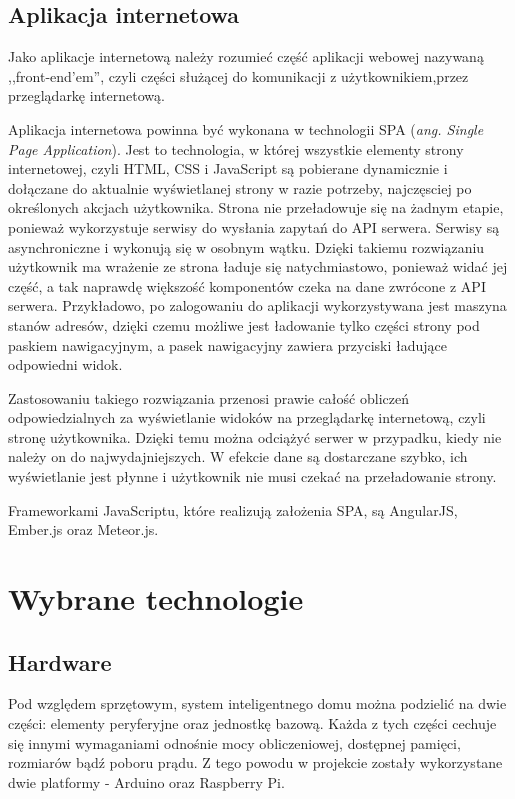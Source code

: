 \documentclass[eng,oneside]{mgr}
\begin{document}
\section{Aplikacja internetowa}
Jako aplikacje internetową należy rozumieć część aplikacji webowej nazywaną ,,front-end’em'', czyli części służącej do komunikacji z użytkownikiem,przez przeglądarkę internetową.

Aplikacja internetowa powinna być wykonana w technologii SPA (\emph{ang. Single Page Application}). Jest to technologia, w której wszystkie elementy strony internetowej, czyli HTML, CSS i JavaScript są pobierane dynamicznie i dołączane do aktualnie wyświetlanej strony w razie potrzeby, najczęsciej po określonych akcjach użytkownika. Strona nie przeładowuje się na żadnym etapie, ponieważ wykorzystuje serwisy do wysłania zapytań do API serwera. Serwisy są asynchroniczne i wykonują się w osobnym wątku. Dzięki takiemu rozwiązaniu użytkownik ma wrażenie ze strona ładuje się natychmiastowo, ponieważ widać jej część, a tak naprawdę większość komponentów czeka na dane zwrócone z API serwera. Przykładowo, po zalogowaniu do aplikacji wykorzystywana jest maszyna stanów adresów, dzięki czemu możliwe jest ładowanie tylko części strony pod paskiem nawigacyjnym, a pasek nawigacyjny zawiera przyciski ładujące odpowiedni widok.

Zastosowaniu takiego rozwiązania przenosi prawie całość obliczeń odpowiedzialnych za wyświetlanie widoków na przeglądarkę internetową, czyli stronę użytkownika. Dzięki temu można odciążyć serwer w przypadku, kiedy nie należy on do najwydajniejszych. W efekcie dane są dostarczane szybko, ich wyświetlanie jest płynne i użytkownik nie musi czekać na przeładowanie strony.

Frameworkami JavaScriptu, które realizują założenia SPA, są AngularJS, Ember.js oraz Meteor.js.

\chapter{Wybrane technologie}
\section{Hardware}
Pod względem sprzętowym, system inteligentnego domu można podzielić na dwie części: elementy peryferyjne oraz jednostkę bazową. Każda z tych części cechuje się innymi wymaganiami odnośnie mocy obliczeniowej, dostępnej pamięci, rozmiarów bądź poboru prądu. Z tego powodu w projekcie zostały wykorzystane dwie platformy - Arduino oraz Raspberry Pi.
\end{document}
